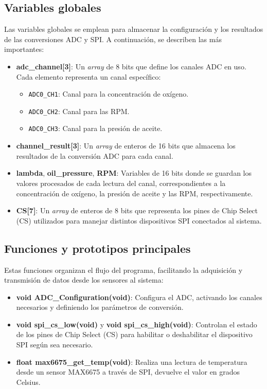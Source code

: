 \subsection{Variables globales}

Las variables globales se emplean para almacenar la configuración y los resultados de las conversiones ADC y SPI. A continuación, se describen las más importantes:

\begin{itemize}
    \item \textbf{adc\_channel[3]}: Un \textit{array} de 8 bits que define los canales ADC en uso. Cada elemento representa un canal específico:
        \begin{itemize}
            \item \texttt{ADC0\_CH1}: Canal para la concentración de oxígeno.
            \item \texttt{ADC0\_CH2}: Canal para las RPM.
            \item \texttt{ADC0\_CH3}: Canal para la presión de aceite.
        \end{itemize}
        
    \item \textbf{channel\_result[3]}: Un \textit{array} de enteros de 16 bits que almacena los resultados de la conversión ADC para cada canal.

    \item \textbf{lambda}, \textbf{oil\_pressure}, \textbf{RPM}: Variables de 16 bits donde se guardan los valores procesados de cada lectura del canal, correspondientes a la concentración de oxígeno, la presión de aceite y las RPM, respectivamente.

    \item \textbf{CS[7]}: Un \textit{array} de enteros de 8 bits que representa los pines de Chip Select (CS) utilizados para manejar distintos dispositivos SPI conectados al sistema.
\end{itemize}

\subsection{Funciones y prototipos principales}

Estas funciones organizan el flujo del programa, facilitando la adquisición y transmisión de datos desde los sensores al sistema:

\begin{itemize}
    \item \textbf{void ADC\_Configuration(void)}: Configura el ADC, activando los canales necesarios y definiendo los parámetros de conversión.

    \item \textbf{void spi\_cs\_low(void)} y \textbf{void spi\_cs\_high(void)}: Controlan el estado de los pines de Chip Select (CS) para habilitar o deshabilitar el dispositivo SPI según sea necesario.

    \item \textbf{float max6675\_get\_temp(void)}: Realiza una lectura de temperatura desde un sensor MAX6675 a través de SPI, devuelve el valor en grados Celsius.
\end{itemize}

